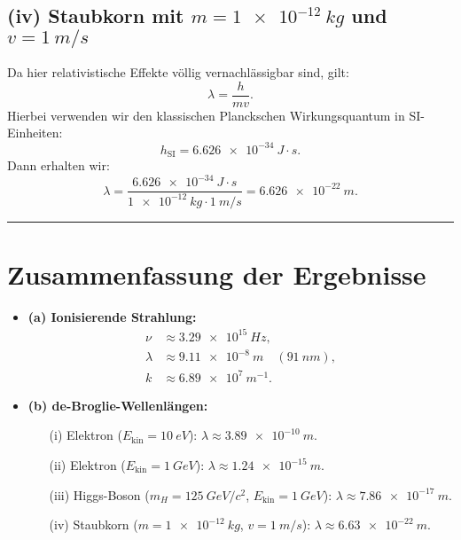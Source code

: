 \documentclass[12pt]{article}
\begin{document}
\subsection*{(iv) Staubkorn mit \(m = \SI{1e-12}{kg}\) und \(v = \SI{1}{m/s}\)}

Da hier relativistische Effekte völlig vernachlässigbar sind, gilt:
\[
\lambda = \frac{h}{mv}.
\]
Hierbei verwenden wir den klassischen Planckschen Wirkungsquantum in SI-Einheiten:
\[
h_{\mathrm{SI}} = \SI{6.626e-34}{J\cdot s}.
\]
Dann erhalten wir:
\[
\lambda = \frac{\SI{6.626e-34}{J\cdot s}}{\SI{1e-12}{kg} \cdot \SI{1}{m/s}} = \SI{6.626e-22}{m}.
\]

\vspace{1em}
\hrule
\vspace{1em}

\section*{Zusammenfassung der Ergebnisse}

\begin{itemize}
    \item \textbf{(a) Ionisierende Strahlung:}
    \begin{align*}
        \nu &\approx \SI{3.29e15}{Hz}, \\
        \lambda &\approx \SI{9.11e-8}{m} \quad (\SI{91}{nm}), \\
        k &\approx \SI{6.89e7}{m^{-1}}.
    \end{align*}
    \item \textbf{(b) de-Broglie-Wellenlängen:}
    \begin{enumerate}
        \item[(i)] Elektron (\(E_{\mathrm{kin}} = \SI{10}{eV}\)): \(\lambda \approx \SI{3.89e-10}{m}\).
        \item[(ii)] Elektron (\(E_{\mathrm{kin}} = \SI{1}{GeV}\)): \(\lambda \approx \SI{1.24e-15}{m}\).
        \item[(iii)] Higgs-Boson (\(m_H = \SI{125}{GeV}/c^2\), \(E_{\mathrm{kin}} = \SI{1}{GeV}\)): \(\lambda \approx \SI{7.86e-17}{m}\).
        \item[(iv)] Staubkorn (\(m = \SI{1e-12}{kg}\), \(v = \SI{1}{m/s}\)): \(\lambda \approx \SI{6.63e-22}{m}\).
    \end{enumerate}
\end{itemize}
\end{document}
